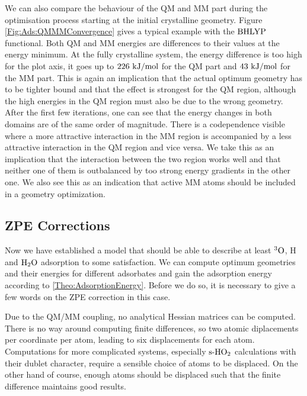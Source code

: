 \documentclass[8.5pt,twoside,twocolumn]{article}
\newcommand\sur{\enmat{\te{s-}}}
\newcommand\tripo{\enmat{{^3\te{O}}}}
\newcommand\kmo{\enmat{\te {kJ/mol}}}
\theoremstyle{standard}
\begin{document}
We can also compare the behaviour of the QM and MM part during the optimisation
process starting at the initial crystalline geometry. Figure \ref{Fig:Ads:QMMMConvergence}
gives a typical example with the $\text{BHLYP}$ functional. Both QM and MM energies are differences to
their values at the energy minimum. At the fully crystalline system, the
energy difference is too high for the plot axis, it goes up to $226~\kmo$ for the
QM part and $43~\kmo$ for the MM part. This is again an implication that the actual
optimum geometry has to be tighter bound and that the effect is strongest for the
QM region, although the high energies in the QM region must also be due to the
wrong geometry. After the first few iterations, one can see that the
energy changes in both domains are of the same order of magnitude. There is a codependence visible
where a more attractive interaction in the MM region is accompanied by a
less attractive interaction in the QM region and vice versa. We take
this as an implication that the interaction between the two region works
well and that neither one of them is outbalanced by too strong energy
gradients in the other one. We also see this as an indication that active MM atoms
should be included in a geometry optimization.

\subsection{ZPE Corrections}
\label{Sec:Ads:ZPE}

Now we have established a model that should be able to describe at least $\tripo$, 
H and $\text H _2 \text O$ adsorption to some satisfaction. We can compute optimum geometries
and their energies for different adsorbates and gain the adsorption energy
according to \eqref{Theo:AdsorptionEnergy}. Before we do so, it is necessary
to give a few words on the ZPE correction in this case.

Due to the QM/MM coupling, no analytical Hessian matrices can be computed.
There is no way around computing finite differences, so two atomic
diplacements per coordinate per atom, leading to six displacements
for each atom. Computations for more complicated systems, especially $\sur\hot$ calculations
with their dublet character, require a sensible choice
of atoms to be displaced. On the other hand of course, enough atoms should
be displaced such that the finite difference maintains good results.
\end{document}
